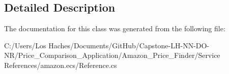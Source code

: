 \subsection{Detailed Description}


The documentation for this class was generated from the following file\-:\begin{DoxyCompactItemize}
\item 
C\-:/\-Users/\-Los Haches/\-Documents/\-Git\-Hub/\-Capstone-\/\-L\-H-\/\-N\-N-\/\-D\-O-\/\-N\-R/\-Price\-\_\-\-Comparison\-\_\-\-Application/\-Amazon\-\_\-\-Price\-\_\-\-Finder/\-Service References/amazon.\-ecs/Reference.\-cs\end{DoxyCompactItemize}
